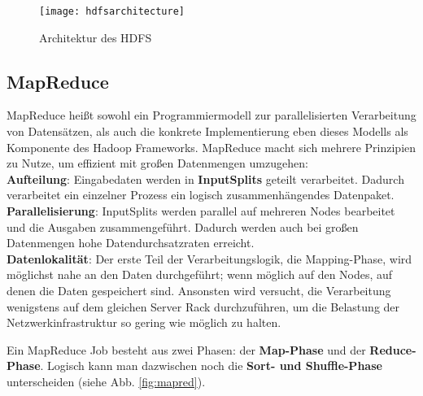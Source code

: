 \begin{figure}[ht]
    \centering
    \texttt{[image: hdfsarchitecture]}
    \caption[Architektur des HDFS]{Architektur des HDFS\parencite[S.69, Figure 3-2]{white_hadoop_2015}}
    \label{fig:hdfs}
\end{figure}

\subsection{MapReduce}
\label{chap:fund sec:core sub:mapred}
MapReduce heißt sowohl ein Programmiermodell zur parallelisierten Verarbeitung von Datensätzen, als auch die konkrete Implementierung eben dieses Modells als Komponente des Hadoop Frameworks. MapReduce macht sich mehrere Prinzipien zu Nutze, um effizient mit großen Datenmengen umzugehen\cite{freiknecht_big_2018}: \\
\textbf{Aufteilung}: Eingabedaten werden in \textbf{InputSplits} geteilt verarbeitet. Dadurch verarbeitet ein einzelner Prozess ein logisch zusammenhängendes Datenpaket.\\
\textbf{Parallelisierung}: InputSplits werden parallel auf mehreren Nodes bearbeitet und die Ausgaben zusammengeführt. Dadurch werden auch bei großen Datenmengen hohe Datendurchsatzraten erreicht.\\
\textbf{Datenlokalität}: Der erste Teil der Verarbeitungslogik, die Mapping-Phase, wird möglichst nahe an den Daten durchgeführt; wenn möglich auf den Nodes, auf denen die Daten gespeichert sind. Ansonsten wird versucht, die Verarbeitung wenigstens auf dem gleichen Server Rack durchzuführen, um die Belastung der Netzwerkinfrastruktur so gering wie möglich zu halten.
\par
Ein MapReduce Job besteht aus zwei Phasen: der \textbf{Map-Phase} und der \textbf{Reduce-Phase}. Logisch kann man dazwischen noch die \textbf{Sort- und Shuffle-Phase} unterscheiden (siehe Abb. \ref*{fig:mapred}).

